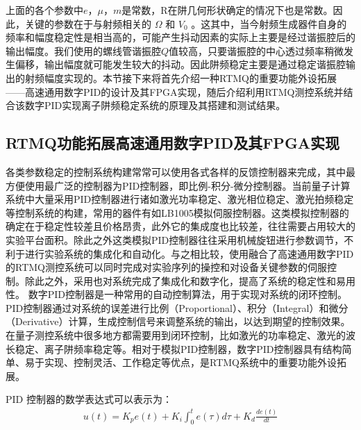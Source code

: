 上面的各个参数中$e$，$\mu$，$m$是常数，R在阱几何形状确定的情况下也是常数。因此，关键的参数在于与射频相关的 $\Omega$ 和 $V_0$ 。这其中，当今射频生成器件自身的频率和幅度稳定性是相当高的，可能产生抖动因素的实际上主要是经过谐振腔后的输出幅度。我们使用的螺线管谐振腔$Q$值较高，只要谐振腔的中心透过频率稍微发生偏移，输出幅度就可能发生较大的抖动。因此阱频稳定主要是通过稳定谐振腔输出的射频幅度实现的。本节接下来将首先介绍一种RTMQ的重要功能外设拓展——高速通用数字PID的设计及其FPGA实现，随后介绍利用RTMQ测控系统并结合该数字PID实现离子阱频稳定系统的原理及其搭建和测试结果。

\subsection[RTMQ功能拓展高速通用数字PID及其FPGA实现]{RTMQ功能拓展高速通用数字PID及其FPGA实现\label{section:digital_pid}}

各类参数稳定的控制系统构建常常可以使用各式各样的反馈控制器来完成，其中最方便使用最广泛的控制器为PID控制器，即比例-积分-微分控制器。当前量子计算系统中大量采用PID控制器进行诸如激光功率稳定、激光相位稳定、激光拍频稳定等控制系统的构建，常用的器件有如LB1005模拟伺服控制器。这类模拟控制器的确定在于稳定性较差且价格昂贵，此外它的集成度也比较差，往往需要占用较大的实验平台面积。除此之外这类模拟PID控制器往往采用机械旋钮进行参数调节，不利于进行实验系统的集成化和自动化。与之相比较，使用融合了高速通用数字PID的RTMQ测控系统可以同时完成对实验序列的操控和对设备关键参数的伺服控制。除此之外，采用也对系统完成了集成化和数字化，提高了系统的稳定性和易用性。
数字PID控制器是一种常用的自动控制算法，用于实现对系统的闭环控制。PID控制器通过对系统的误差进行比例（Proportional）、积分（Integral）和微分（Derivative）计算，生成控制信号来调整系统的输出，以达到期望的控制效果。在量子测控系统中很多地方都需要用到闭环控制，比如激光的功率稳定、激光的波长稳定、离子阱频率稳定等。相对于模拟PID控制器，数字PID控制器具有结构简单、易于实现、控制灵活、工作稳定等优点，是RTMQ系统中的重要功能外设拓展。

PID 控制器的数学表达式可以表示为：
\begin{align}
    u(t)= K_p e(t) + K_i \int_{0}^{t} e(\tau) d\tau + K_d \frac{d e(t)}{dt}
\end{align}

